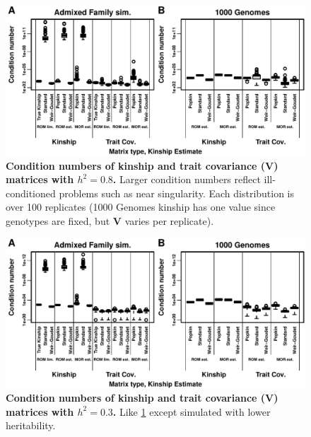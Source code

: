 \documentclass[11pt]{article}
\begin{document}
\begin{figure}[bp!]
  \centering
  \includegraphics[width=\textwidth]{kappa.pdf}
  \caption{
    {\bf Condition numbers of kinship and trait covariance ($\mathbf{V}$) matrices with $h^2=0.8$.}
    Larger condition numbers reflect ill-conditioned problems such as near singularity.
    Each distribution is over 100 replicates (1000 Genomes kinship has one value since genotypes are fixed, but $\mathbf{V}$ varies per replicate).
  }
  \label{fig:kappa}
\end{figure}

\begin{figure}[bp!]
  \centering
  \includegraphics[width=\textwidth]{h-0.3/kappa.pdf}
  \caption{
    {\bf Condition numbers of kinship and trait covariance ($\mathbf{V}$) matrices with $h^2=0.3$.}
    Like \cref{fig:kappa} except simulated with lower heritability.
  }
  \label{fig:kappa-h3}
\end{figure}
\end{document}
